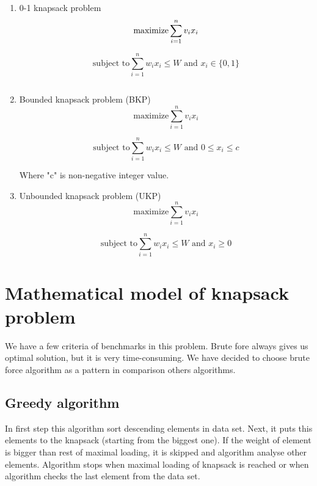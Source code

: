 \documentclass[conference,compsoc]{IEEEtran}
\begin{document}
\begin{enumerate}
  \item 0-1 knapsack problem\\
  
  \begin{equation}
  \textrm{maximize}\sum_{i=1}^{n}v_{i}x_{i} \\
  \end{equation}
  
  \begin{equation}
    \textrm{subject to} \sum_{i=1}^{n}w_{i}x_{i} \leqslant W           \textrm{ and } x_{i} \in \{0,1\}
  \end{equation}
	  
  
  $$  $$
  \item Bounded knapsack problem (BKP)\\
  \begin{equation}
   \textrm{maximize}\sum_{i=1}^{n}v_{i}x_{i} 
  \end{equation}
  
  \begin{equation}
   \textrm{subject to} \sum_{i=1}^{n}w_{i}x_{i} \leqslant W \textrm{ and } 0 \leqslant x_{i} \leqslant c 
  \end{equation}
   
Where "c" is non-negative integer value.\\

  \item Unbounded knapsack problem (UKP)\\
\begin{equation}
 \textrm{maximize}\sum_{i=1}^{n}v_{i}x_{i} 
\end{equation}

\begin{equation}
\textrm{subject to} \sum_{i=1}^{n}w_{i}x_{i} \leqslant W \textrm{ and }  x_{i} \geqslant 0 
\end{equation}

\end{enumerate}


\section{Mathematical model of knapsack problem}
We have a few criteria of benchmarks in this problem. Brute fore always gives us optimal solution, but it is very time-consuming. We have decided to choose brute force algorithm as a pattern in comparison others algorithms.

\subsection{Greedy algorithm}
In first step this algorithm sort descending elements in data set. Next, it puts this elements to the knapsack (starting from the biggest one). If the weight of element is bigger than rest of maximal loading, it is skipped and algorithm analyse other elements. Algorithm stops when maximal loading of knapsack is reached or when algorithm checks the last element from the data set.
\end{document}
